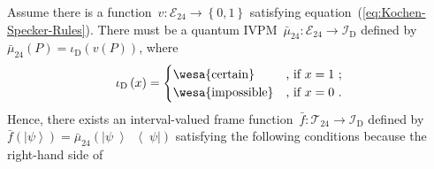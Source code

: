 \documentclass[english,reprint, aps, prl,superscriptaddress, showpacs,
showkeys]{revtex4-1}
\theoremstyle{plain}
\theoremstyle{definition}
\newcommand{\events}{\ensuremath{\mathcal{E}}}
\newcommand{\imposs}{{\mbox{\wesa{impossible}}}}
\newcommand{\necess}{{\mbox{\wesa{certain}}}}
\newcommand{\ket}[1]{{\left\vert{#1}\right\rangle}}
\newcommand{\op}[2]{\ensuremath{\left\vert{#1}\middle\rangle\middle\langle{#2}\right\vert}}
\newcommand{\proj}[1]{\op{#1}{#1}}
\begin{document}
Assume there is a function~$v:\events_{24}\rightarrow\left\{ 0,1\right\} $
satisfying equation~(\ref{eq:Kochen-Specker-Rules}). There must
be a quantum IVPM~$\bar{\mu}_{24}:\events_{24}\rightarrow\mathscr{I}_{\mathrm{D}}$
defined by $\bar{\mu}_{24}\left(P\right)=\iota_{\mathrm{D}}\left(v\left(P\right)\right)$,
where 
\begin{equation}
\iota_{\mathrm{D}}\left(x\right)=\begin{cases}
\necess & \text{, if }x=1\text{ ;}\\
\imposs & \text{, if }x=0\text{ .}
\end{cases}\label{eq:homomorphism-0}
\end{equation}
Hence, there exists an interval-valued frame function~$\bar{f}:\mathcal{T}_{24}\rightarrow\mathscr{I}_{\mathrm{D}}$
defined by $\bar{f}\left(\ket{\psi}\right)=\bar{\mu}_{24}\left(\proj{\psi}\right)$
satisfying the following conditions because the right-hand side of
\end{document}
